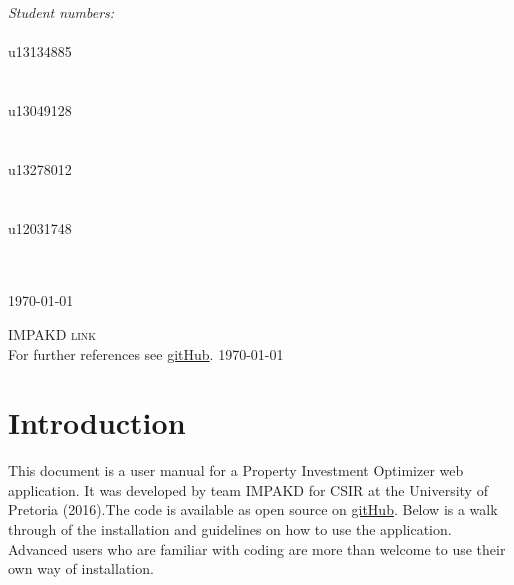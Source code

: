 \documentclass[a4paper,12pt]{article}
\begin{document}
\begin{titlepage}
\begin{center}
\begin{minipage}{0.4\textwidth}
\begin{flushright}
\emph{ \Large Student numbers:} \\[0.4cm]  
\emph{}\\
{\Large u13134885}\\
\emph{}\\
\emph{}\\
{\Large u13049128}\\
\emph{}\\
\emph{}\\
{\Large u13278012}\\
\emph{}\\
\emph{}\\
{\Large u12031748}\\
\emph{}\\
\emph{}\\

\end{flushright}
\end{minipage}


{\large \today}
\end{center}
\end{titlepage}
\renewcommand{\thesection}{\arabic{section}}

\newpage
\begin{center}
\textsc{\Large IMPAKD link}\\[0.5cm]
For further references see \href{https://github.com/u13278012/IMPAKD/}{gitHub}.
\today
\end{center}
\newpage
\tableofcontents{}

\newpage 
\section{Introduction}
This document is a user manual for a Property Investment Optimizer web application. It was developed by team IMPAKD for CSIR at the University of Pretoria (2016).The code is available as open source on \href{https://github.com/u13278012/IMPAKD/}{gitHub}. Below is a walk through of the installation and guidelines on how to use the application. Advanced users who are familiar with coding are more than welcome to use their own way of installation. 
\end{document}
